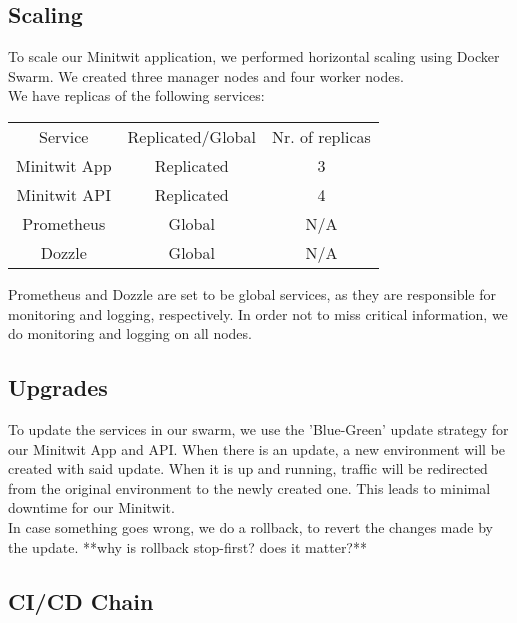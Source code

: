 \subsection{Scaling}
To scale our Minitwit application, we performed horizontal scaling using Docker Swarm. We created three manager nodes and four worker nodes. \\
We have replicas of the following services:\\
\begin{center}
\begin{tabular}{ |c|c|c| } 
 \hline
 Service & Replicated/Global & Nr. of replicas \\ 
 Minitwit App & Replicated & 3 \\ 
 Minitwit API & Replicated & 4 \\
 Prometheus & Global & N/A \\ 
 Dozzle & Global & N/A \\ 
 \hline
\end{tabular}
\end{center}

Prometheus and Dozzle are set to be global services, as they are responsible for monitoring and logging, respectively. In order not to miss critical information, we do monitoring and logging on all nodes.

\subsection{Upgrades}
To update the services in our swarm, we use the 'Blue-Green' update strategy for our Minitwit App and API. When there is an update, a new environment will be created with said update. When it is up and running, traffic will be redirected from the original environment to the newly created one. This leads to minimal downtime for our Minitwit.\\
In case something goes wrong, we do a rollback, to revert the changes made by the update. **why is rollback stop-first? does it matter?**

\subsection{CI/CD Chain}
